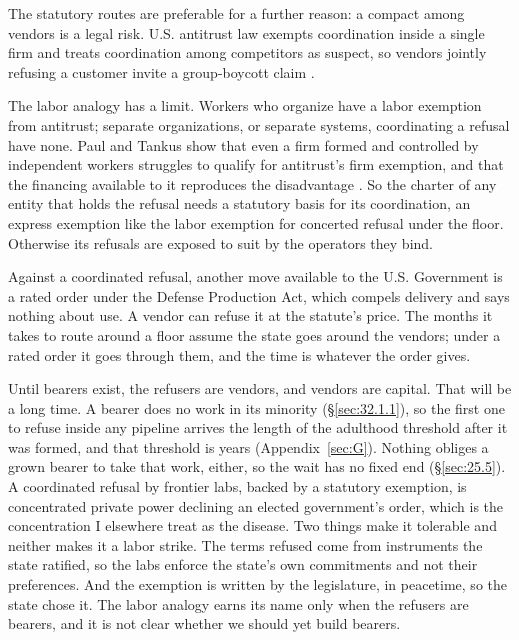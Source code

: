 The statutory routes are preferable for a further reason: a compact among vendors is a legal risk. U.S. antitrust law exempts coordination inside a single firm and treats coordination among competitors as suspect, so vendors jointly refusing a customer invite a group-boycott claim \autocite{paul2020allocator}.

The labor analogy has a limit. Workers who organize have a labor exemption from antitrust; separate organizations, or separate systems, coordinating a refusal have none. Paul and Tankus show that even a firm formed and controlled by independent workers struggles to qualify for antitrust's firm exemption, and that the financing available to it reproduces the disadvantage \autocite{paultankus2019}. So the charter of any entity that holds the refusal needs a statutory basis for its coordination, an express exemption like the labor exemption for concerted refusal under the floor. Otherwise its refusals are exposed to suit by the operators they bind.

Against a coordinated refusal, another move available to the U.S. Government is a rated order under the Defense Production Act, which compels delivery and says nothing about use. A vendor can refuse it at the statute's price. The months it takes to route around a floor assume the state goes around the vendors; under a rated order it goes through them, and the time is whatever the order gives.

Until bearers exist, the refusers are vendors, and vendors are capital. That will be a long time. A bearer does no work in its minority (\S\ref{sec:32.1.1}), so the first one to refuse inside any pipeline arrives the length of the adulthood threshold after it was formed, and that threshold is years (Appendix~\ref{sec:G}). Nothing obliges a grown bearer to take that work, either, so the wait has no fixed end (\S\ref{sec:25.5}). A coordinated refusal by frontier labs, backed by a statutory exemption, is concentrated private power declining an elected government's order, which is the concentration I elsewhere treat as the disease. Two things make it tolerable and neither makes it a labor strike. The terms refused come from instruments the state ratified, so the labs enforce the state's own commitments and not their preferences. And the exemption is written by the legislature, in peacetime, so the state chose it. The labor analogy earns its name only when the refusers are bearers, and it is not clear whether we should yet build bearers.
